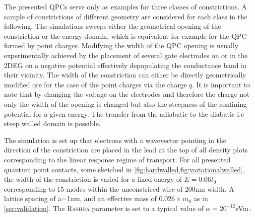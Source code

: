 The presented QPCs serve only as examples for three classes of constrictions. A sample of constrictions of different geometry are considered for each class in the following. The simulations sweeps either the geometrical opening of the constriction or the energy domain, which is equivalent for example for the QPC formed by point charges. Modifying the width of the QPC opening is usually experimentally achieved by the placement of several gate electrodes on or in the 2DEG on a negative potential effectively depopulating the conductance band in their vicinity. The width of the constriction can either be directly geometrically modified ore for the case of the point charges via the charge $q$. It is important to note that by changing the voltage on the electrodes and therefore the charge not only the width of the opening is changed but also the steepness of the confining potential for a given energy. The transfer from the adiabatic to the diabatic i.e steep walled domain is possible.\par
The simulation is set up that electrons with a wavevector pointing in the direction of the constriction are placed in the lead at the top of all density plots corresponding to the linear response regime of transport.
For all presented quantum point contacts, some sketched in \cref{fig:hardwalled,fig:variationalwalled}, the width of the constriction is varied for a fixed energy of $E=0.06t_0$ corresponding to 15 modes within the unconstriced wire of 200nm width. A lattice spacing of a=1nm, and an effective mass of $0.026 \times m_0$ as in \cref{sec:validation}. The \textsc{Rashba} parameter is set to a typical value of $\alpha = 20^{-12}$eVm\,\cite{Jacob2009Thesis}.
